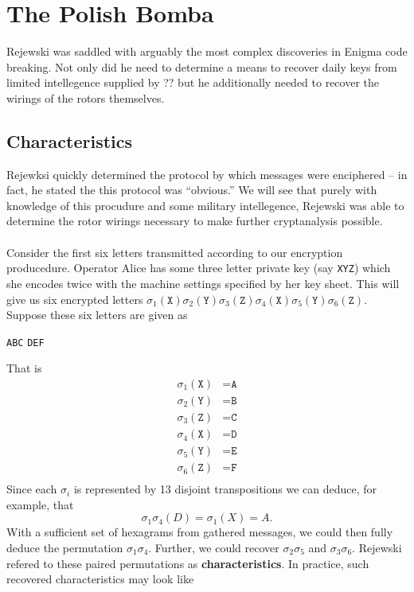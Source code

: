 \chapter{The Polish Bomba}

Rejewski was saddled with arguably the most complex discoveries in Enigma code breaking. Not only did he need to determine a means to recover daily keys from limited intellegence supplied by ?? but he additionally needed to recover the wirings of the rotors themselves.
\section{Characteristics}
Rejewksi quickly determined the protocol by which messages were enciphered -- in fact, he stated the this protocol was ``obvious.'' We will see that purely with knowledge of this procudure and some military intellegence, Rejewski was able to determine the rotor wirings necessary to make further cryptanalysis possible.
\\\\Consider the first six letters transmitted according to our encryption producedure. Operator Alice has some three letter private key (say \texttt{XYZ}) which she encodes twice with the machine settings specified by her key sheet. This will give us six encrypted letters $\sigma_1(\texttt{X})\sigma_2(\texttt{Y})\sigma_3(\texttt{Z})\sigma_4(\texttt{X})\sigma_5(\texttt{Y})\sigma_6(\texttt{Z})$. Suppose these six letters are given as
\begin{center}
	\texttt{ABC} \texttt{DEF}
\end{center}
That is
\begin{align*}
	\sigma_1(\texttt{X}) & = \texttt{A} \\
	\sigma_2(\texttt{Y}) & = \texttt{B} \\
	\sigma_3(\texttt{Z}) & = \texttt{C} \\
	\sigma_4(\texttt{X}) & = \texttt{D} \\
	\sigma_5(\texttt{Y}) & = \texttt{E} \\
	\sigma_6(\texttt{Z}) & = \texttt{F} \\
\end{align*}
Since each $\sigma_i$ is represented by 13 disjoint transpositions we can deduce, for example, that
\[
	\sigma_1\sigma_4(D) = \sigma_1(X) = A.
\]
With a sufficient set of hexagrams from gathered messages, we could then fully deduce the permutation $\sigma_1\sigma_4$. Further, we could recover $\sigma_2\sigma_5$ and $\sigma_3\sigma_6$. Rejewski refered to these paired permutations as {\bf{characteristics}}. In practice, such recovered characteristics may look like
